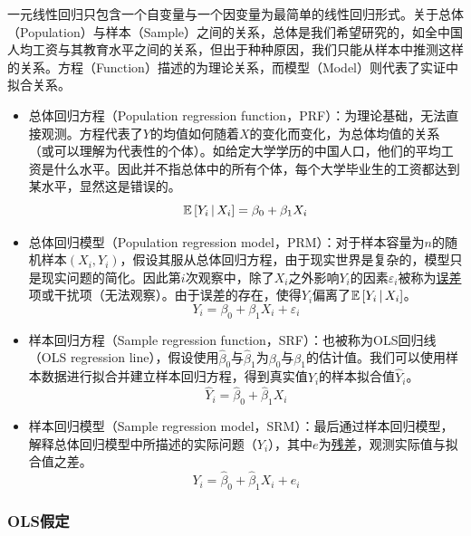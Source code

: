 \documentclass[11pt]{article}
\begin{document}
一元线性回归只包含一个自变量与一个因变量为最简单的线性回归形式。关于总体（Population）与样本（Sample）之间的关系，总体是我们希望研究的，如全中国人均工资与其教育水平之间的关系，但出于种种原因，我们只能从样本中推测这样的关系。方程（Function）描述的为理论关系，而模型（Model）则代表了实证中拟合关系。
\begin{itemize}
    \item 总体回归方程（Population regression function，PRF）：为理论基础，无法直接观测。方程代表了$Y$的均值如何随着$X$的变化而变化，为总体均值的关系（或可以理解为代表性的个体）。如给定大学学历的中国人口，他们的平均工资是什么水平。因此并不指总体中的所有个体，每个大学毕业生的工资都达到某水平，显然这是错误的。
    \begin{equation*}
        \mathbb{E}\left[ Y_i \,\vert\, X_i \right] = \beta_0 + \beta_1 X_i
    \end{equation*}
    \item 总体回归模型（Population regression model，PRM）：对于样本容量为$n$的随机样本$(X_i,Y_i)$，假设其服从总体回归方程，由于现实世界是复杂的，模型只是现实问题的简化。因此第$i$次观察中，除了$X_i$之外影响$Y_i$的因素$\varepsilon_i$被称为\uline{误差}项或干扰项（无法观察）。由于误差的存在，使得$Y_i$偏离了$\mathbb{E}\left[ Y_i \,\vert\, X_i \right]$。
    \begin{equation*}
        Y_i = \beta_0 + \beta_1 X_i + \varepsilon_i
    \end{equation*}
    \item 样本回归方程（Sample regression function，SRF）：也被称为OLS回归线（OLS regression line），假设使用$\hat{\beta}_0$与$\hat{\beta}_1$为$\beta_0$与$\beta_1$的估计值。我们可以使用样本数据进行拟合并建立样本回归方程，得到真实值$Y_i$的样本拟合值$\hat{Y}_i$。
    \begin{equation*}
        \hat{Y}_i = \hat{\beta}_0 + \hat{\beta}_1 X_i
    \end{equation*}
    \item 样本回归模型（Sample regression model，SRM）：最后通过样本回归模型，解释总体回归模型中所描述的实际问题（$Y_i$），其中$e$为\uline{残差}，观测实际值与拟合值之差。
    \begin{equation*}
        Y_i = \hat{\beta}_0 + \hat{\beta}_1 X_i + e_i
    \end{equation*}
\end{itemize}

\subsubsection{OLS假定}
\end{document}
